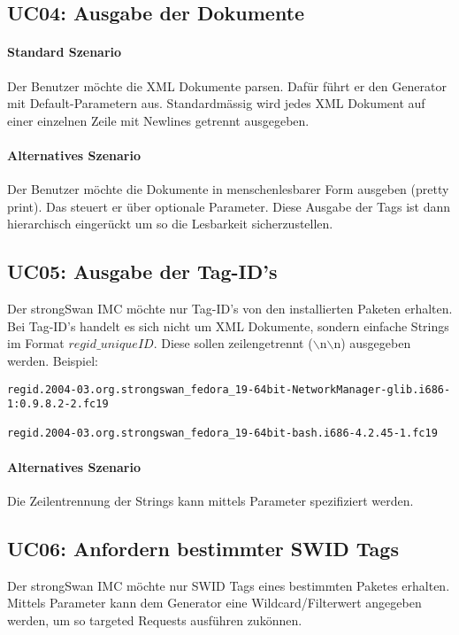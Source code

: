 \subsection{UC04: Ausgabe der Dokumente}

\paragraph{Standard Szenario}
Der Benutzer möchte die XML Dokumente parsen. Dafür führt er den Generator mit
Default-Parametern aus. Standardmässig wird jedes XML Dokument auf einer einzelnen Zeile
mit Newlines getrennt ausgegeben.

\paragraph{Alternatives Szenario}
Der Benutzer möchte die Dokumente in menschenlesbarer Form ausgeben (pretty
print). Das steuert er über optionale Parameter. Diese Ausgabe der Tags ist dann
hierarchisch eingerückt um so die Lesbarkeit sicherzustellen.

\subsection{UC05: Ausgabe der Tag-ID's}
Der strongSwan IMC möchte nur Tag-ID's von den installierten Paketen erhalten. Bei Tag-ID's handelt es sich nicht um XML Dokumente, sondern einfache Strings im Format $regid\_uniqueID $. Diese sollen zeilengetrennt ($\backslash$n$\backslash$n) ausgegeben werden. Beispiel:\\
\begin{verbatim}
regid.2004-03.org.strongswan_fedora_19-64bit-NetworkManager-glib.i686-1:0.9.8.2-2.fc19

regid.2004-03.org.strongswan_fedora_19-64bit-bash.i686-4.2.45-1.fc19
\end{verbatim}
\paragraph{Alternatives Szenario}
Die Zeilentrennung der Strings kann mittels Parameter spezifiziert werden.

\subsection{UC06: Anfordern bestimmter SWID Tags}
Der strongSwan IMC möchte nur SWID Tags eines bestimmten Paketes erhalten.
Mittels Parameter kann dem Generator eine Wildcard/Filterwert angegeben werden, um so targeted Requests ausführen zukönnen.

